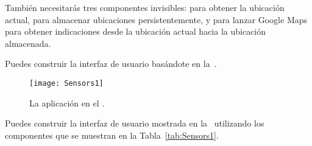 También necesitarás tres componentes invisibles:
 para obtener la ubicación actual,
 para almacenar ubicaciones persistentemente, y
 para lanzar Google Maps para obtener
indicaciones desde la ubicación actual hacia la ubicación almacenada.

Puedes construir la interfaz de usuario basándote en
la~.

\begin{figure}[H]
\vspace{3em}
\centering
\texttt{[image: Sensors1]}
\caption{La aplicación  en el \componentDesigner.}
\label{fig:Sensors1}
\end{figure}

Puedes construir la interfaz de usuario mostrada en
la~ utilizando los componentes que se muestran en
la Tabla~\ref{tab:Sensors1}.

